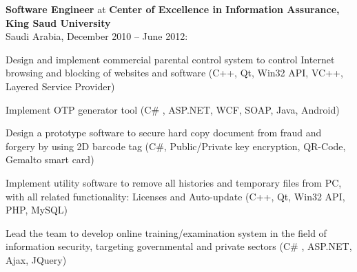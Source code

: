 \documentclass[letterpaper]{article}
\renewenvironment{itemize}{
  \begin{list}{}{
    \setlength{\leftmargin}{1.5em}
  }
}{
  \end{list}
}
\begin{document}
\begin{itemize}
\item \textbf{Software Engineer} at \textbf{Center of Excellence in Information Assurance, King Saud University} \\ Saudi Arabia, December 2010 -- June 2012:
\begin{itemize}
\item Design and implement commercial parental control system to control Internet browsing and blocking of websites and software (C++, Qt, Win32 API, VC++, Layered Service Provider)
\item Implement OTP generator tool (C\# , ASP.NET, WCF, SOAP, Java, Android)
\item Design a prototype software to secure hard copy document from fraud and forgery by using 2D barcode tag (C\#, Public/Private key encryption, QR-Code, Gemalto smart card)
\item Implement utility software to remove all histories and temporary files from PC, with all related functionality: Licenses and Auto-update (C++, Qt, Win32 API, PHP, MySQL)
\item Lead the team to develop online training/examination system in the field of information security, targeting governmental and private sectors (C\# , ASP.NET, Ajax, JQuery)
\end{itemize}

\end{itemize}
\end{document}
